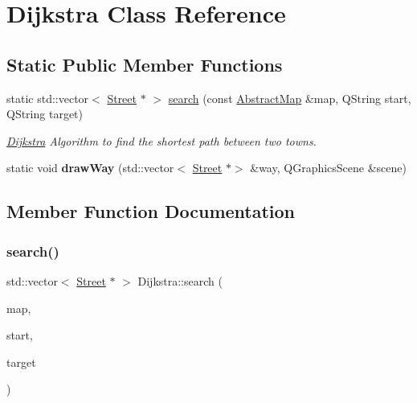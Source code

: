 \hypertarget{class_dijkstra}{}\section{Dijkstra Class Reference}
\label{class_dijkstra}
\subsection*{Static Public Member Functions}
\begin{DoxyCompactItemize}
\item 
static std\+::vector$<$ \hyperlink{class_street}{Street} $\ast$ $>$ \hyperlink{class_dijkstra_aa9c3cc0e47ab3a865dbe9f4e152af71f}{search} (const \hyperlink{class_abstract_map}{Abstract\+Map} \&map, Q\+String start, Q\+String target)
\begin{DoxyCompactList}\small\item\em \hyperlink{class_dijkstra}{Dijkstra} Algorithm to find the shortest path between two towns. \end{DoxyCompactList}\item 
\mbox{\label{class_dijkstra_aa6c60bc89d86bf877cc586557ae8f564}} 
static void {\bfseries draw\+Way} (std\+::vector$<$ \hyperlink{class_street}{Street} $\ast$$>$ \&way, Q\+Graphics\+Scene \&scene)
\end{DoxyCompactItemize}


\subsection{Member Function Documentation}
\mbox{\label{class_dijkstra_aa9c3cc0e47ab3a865dbe9f4e152af71f}} 
\subsubsection{\texorpdfstring{search()}{search()}}
{\footnotesize\ttfamily std\+::vector$<$ \hyperlink{class_street}{Street} $\ast$ $>$ Dijkstra\+::search (\begin{DoxyParamCaption}\item[{const \hyperlink{class_abstract_map}{Abstract\+Map} \&}]{map,  }\item[{Q\+String}]{start,  }\item[{Q\+String}]{target }\end{DoxyParamCaption})\hspace{0.3cm}{\ttfamily [static]}}



